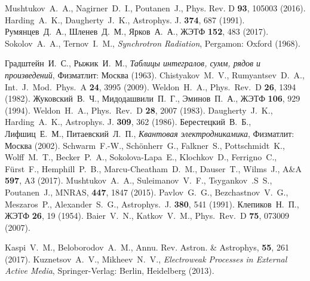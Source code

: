 \documentclass[cp1251%
               ]{jetp} %
\begin{document}
\begin{references}
%
Mushtukov~A.~A., Nagirner~D.~I., Poutanen~J., Phys. Rev. D {\bf 93}, 105003 (2016).
%
Harding~A.~K., Daugherty~J.~K., Astrophys. J. {\bf 374}, 687 (1991).
%
Румянцев~Д.~А., Шленев~Д.~М., Ярков~А.~А., ЖЭТФ {\bf 152}, 483 (2017). 
%
   Sokolov~A.~A., Ternov~I.~M., {\it Synchrotron Radiation}, Pergamon: Oxford (1968).

%
Градштейн~И.~С.,  Рыжик~И.~М., {\it Таблицы интегралов, сумм, рядов и
   произведений}, Физматлит: Москва (1963). 
%
Chistyakov~M.~V., Rumyantsev~D.~A., 
   Int.~J.~Mod.~Phys.~A {\bf 24}, 3995 (2009).
%
Weldon~H.~A., Phys.~Rev.~D {\bf 26}, 1394 (1982).
%
Жуковский~В.~Ч., Мидодашвили~П.~Г., Эминов~П.~А., ЖЭТФ {\bf 106}, 929 (1994). 
%
Weldon~H.~A., Phys.~Rev.~D {\bf 28}, 2007 (1983).
%
Daugherty~J.~K., Harding~A.~K., Astrophys. J. {\bf 309}, 362 (1986).
%
Берестецкий~В.~Б., Лифшиц~Е.~М., Питаевский~Л.~П., {\it Квантовая электродникамика}, Физматлит: Москва (2002). 
%
Schwarm~F.-W.,  Sch{\"o}nherr~G.,  Falkner~S.,  Pottschmidt~K., Wolff~M.~T., Becker~P.~A., Sokolova-Lapa~E., Klochkov~D., Ferrigno~C., F{\"u}rst~F., Hemphill~P.~B., Marcu-Cheatham~D.~M., Dauser~T., Wilms~J., A{\&}A {\bf 597}, A3 (2017).
%
Mushtukov~A.~A., Suleimanov~V.~F., Tsygankov~.S~S., Poutanen~J., MNRAS, {\bf 447}, 1847 (2015).
%
Pavlov~G.~G., Bezchastnov~V.~G., Meszaros~P., Alexander~S.~G.,   
   Astrophys.~J. {\bf 380}, 541 (1991).
%
Клепиков~Н.~П., 
  ЖЭТФ \textbf{26}, 19 (1954).
%
Baier~V.~N., Katkov~V.~M., Phys.~Rev.~D {\bf 75}, 073009 (2007).

%
Kaspi~V.~M., Beloborodov~A.~M., Annu. Rev. Astron. \& Astrophys, {\bf 55}, 261 (2017).
%
Kuznetsov~A.~V., Mikheev~N.~V.,
   {\it Electroweak Processes in External Active Media}, 
   Springer-Verlag: Berlin, Heidelberg (2013).
   

\end{references}
\end{document}
